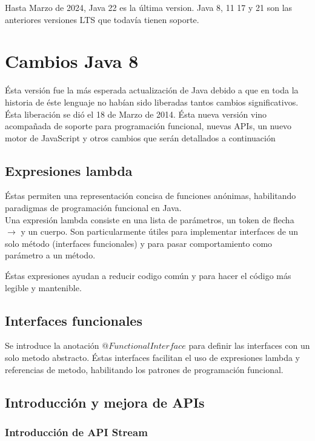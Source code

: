 \documentclass[12pt,article,oneside]{memoir}
\begin{document}
	Hasta Marzo de 2024, Java 22 es la \'ultima version. Java 8, 11 17 y 21 son las anteriores versiones LTS que todav\'ia 
	tienen soporte.\\
	
	
		\section{Cambios Java 8}
		\'Esta versi\'on fue la m\'as esperada actualizaci\'on de Java debido a que en toda la historia de \'este lenguaje 
		no hab\'ian sido liberadas tantos cambios significativos. \'Esta liberaci\'on se di\'o el 18 de Marzo de 2014. \'Esta 
		nueva versi\'on vino acompa\~nada de soporte para programaci\'on funcional, nuevas APIs, un nuevo motor de JavaScript 
		y otros cambios que ser\'an detallados a continuaci\'on \\
			
			\subsection{Expresiones lambda}
			\'Estas permiten una representaci\'on concisa de funciones an\'onimas, habilitando paradigmas de programaci\'on 
			funcional en Java.\\
			
			Una expresi\'on lambda consiste en una lista de par\'ametros, un token de flecha $\rightarrow$ y un cuerpo. Son 
			particularmente  \'utiles para implementar interfaces de un solo m\'etodo (interfaces funcionales) y para pasar
			comportamiento como par\'ametro a un m\'etodo.
			
			\'Estas expresiones ayudan a reducir codigo com\'un y para hacer el c\'odigo m\'as legible y mantenible.
			
			\subsection{Interfaces funcionales}
			Se introduce la anotaci\'on $@FunctionalInterface$ para definir las interfaces con un solo metodo abstracto. \'Estas 
			interfaces facilitan el uso de expresiones lambda y referencias de metodo, habilitando los patrones de programaci\'on 
			funcional.\\
		
			\subsection{Introducci\'on y mejora de APIs}
				\subsubsection{Introducci\'on de API Stream}
\end{document}
